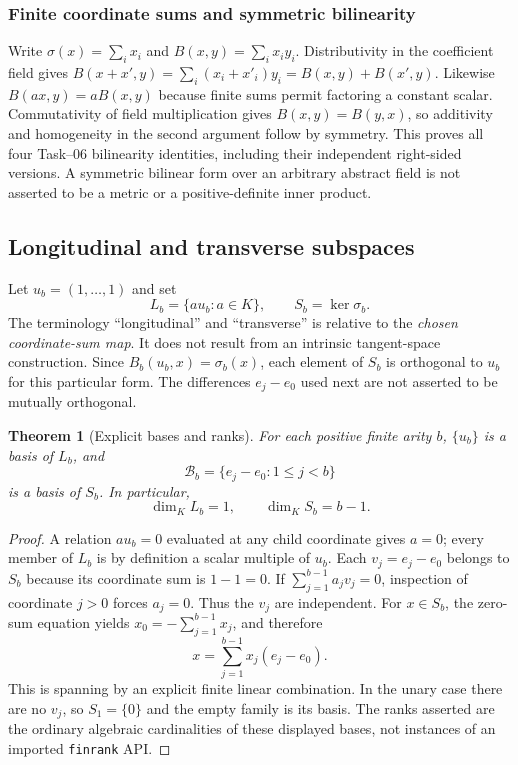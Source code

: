\documentclass[11pt,reqno]{amsart}
\newtheorem{theorem}{Theorem}[section]
\theoremstyle{definition}\newtheorem{definition}[theorem]{Definition}
\theoremstyle{remark}\newtheorem{remark}[theorem]{Remark}
\begin{document}
\subsubsection*{Finite coordinate sums and symmetric bilinearity}\label{supp:8-2}
Write $\sigma(x)=\sum_i x_i$ and $B(x,y)=\sum_i x_iy_i$. Distributivity in the coefficient field gives $B(x+x',y)=\sum_i(x_i+x'_i)y_i=B(x,y)+B(x',y)$. Likewise $B(ax,y)=aB(x,y)$ because finite sums permit factoring a constant scalar. Commutativity of field multiplication gives $B(x,y)=B(y,x)$, so additivity and homogeneity in the second argument follow by symmetry. This proves all four Task--06 bilinearity identities, including their independent right-sided versions. A symmetric bilinear form over an arbitrary abstract field is not asserted to be a metric or a positive-definite inner product.
\medskip

\subsection{Longitudinal and transverse subspaces}\label{main:sub-23}
Let $u_b=(1,\ldots,1)$ and set
\[
L_b=\{a u_b:a\in K\},\qquad S_b=\ker\sigma_b.
\]
The terminology ``longitudinal'' and ``transverse'' is relative to the \emph{chosen coordinate-sum map}. It does not result from an intrinsic tangent-space construction. Since $B_b(u_b,x)=\sigma_b(x)$, each element of $S_b$ is orthogonal to $u_b$ for this particular form. The differences $e_j-e_0$ used next are not asserted to be mutually orthogonal.

\begin{theorem}[Explicit bases and ranks]\label{thm:finitebasis}
For each positive finite arity $b$, $\{u_b\}$ is a basis of $L_b$, and
\[
\mathcal B_b=\{e_j-e_0:1\le j<b\}
\]
is a basis of $S_b$. In particular,
\[
\dim_KL_b=1,\qquad\dim_KS_b=b-1.
\]
\end{theorem}
\begin{proof}
A relation $a u_b=0$ evaluated at any child coordinate gives $a=0$; every member of $L_b$ is by definition a scalar multiple of $u_b$. Each $v_j=e_j-e_0$ belongs to $S_b$ because its coordinate sum is $1-1=0$. If $\sum_{j=1}^{b-1}a_jv_j=0$, inspection of coordinate $j>0$ forces $a_j=0$. Thus the $v_j$ are independent. For $x\in S_b$, the zero-sum equation yields $x_0=-\sum_{j=1}^{b-1}x_j$, and therefore
\[
x=\sum_{j=1}^{b-1}x_j(e_j-e_0).
\]
This is spanning by an explicit finite linear combination. In the unary case there are no $v_j$, so $S_1=\{0\}$ and the empty family is its basis. The ranks asserted are the ordinary algebraic cardinalities of these displayed bases, not instances of an imported \texttt{finrank} API.
\end{proof}
\end{document}
